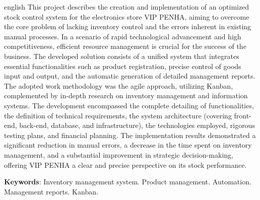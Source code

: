 \documentclass[
	12pt,				%
	openany,			%
	twoside,			%
	a4paper,			%
	english,			%
	brazil				%
	]{abntex2}
\newcommand{\listofquadrosname}{Lista de quadros}
\let\cleardoublepage\clearpage
\begin{document}
\begin{resumo}[Abstract]
 \begin{otherlanguage*}{english}
This project describes the creation and implementation of an optimized stock control system for the electronics store VIP PENHA, aiming to overcome the core problem of lacking inventory control and the errors inherent in existing manual processes. In a scenario of rapid technological advancement and high competitiveness, efficient resource management is crucial for the success of the business. The developed solution consists of a unified system that integrates essential functionalities such as product registration, precise control of goods input and output, and the automatic generation of detailed management reports. The adopted work methodology was the agile approach, utilizing Kanban, complemented by in-depth research on inventory management and information systems. The development encompassed the complete detailing of functionalities, the definition of technical requirements, the system architecture (covering front-end, back-end, database, and infrastructure), the technologies employed, rigorous testing plans, and financial planning. The implementation results demonstrated a significant reduction in manual errors, a decrease in the time spent on inventory management, and a substantial improvement in strategic decision-making, offering VIP PENHA a clear and precise perspective on its stock performance.


   \vspace{\onelineskip}
 
   \noindent 
   \textbf{Keywords}: Inventory management system. Product management. Automation. Management reports. Kanban.
 \end{otherlanguage*}
\end{resumo}



\listoffigures*
\clearpage

\pdfbookmark[0]{\listofquadrosname}{loq}
\listofquadros*
\cleardoublepage

\listoftables*
\cleardoublepage



\tableofcontents*
\cleardoublepage
\end{document}
